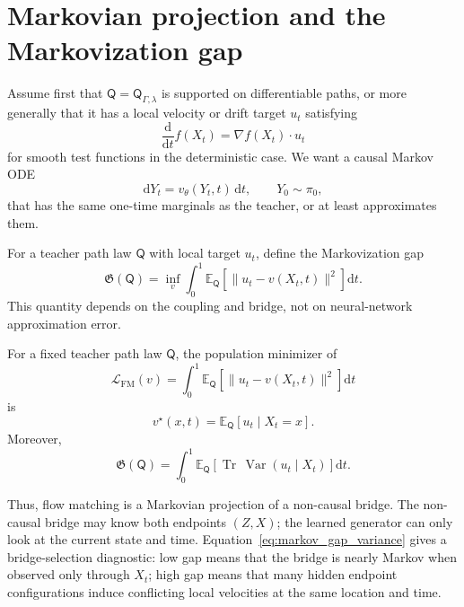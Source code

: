 \documentclass[twoside,11pt]{jmlr}
\numberwithin{equation}{section}
\newcommand{\E}{\mathbb{E}}
\newcommand{\dd}{\mathrm{d}}
\newcommand{\pbase}{\pi_0}
\newcommand{\scrQ}{\mathsf{Q}}
\newcommand{\Var}{\operatorname{Var}}
\newcommand{\Tr}{\operatorname{Tr}}
\begin{document}
\section{Markovian projection and the Markovization gap}
\label{sec:markovization}

Assume first that $\scrQ=\scrQ_{\Gamma,\lambda}$ is supported on differentiable paths, or more generally that it has a local velocity or drift target $u_t$ satisfying
\begin{equation}
    \frac{\dd}{\dd t} f(X_t)=\nabla f(X_t)\cdot u_t
\end{equation}
for smooth test functions in the deterministic case. We want a causal Markov ODE
\begin{equation}
    \dd Y_t=v_\theta(Y_t,t)\,\dd t,\qquad Y_0\sim\pbase,
    \label{eq:ode_decoder}
\end{equation}
that has the same one-time marginals as the teacher, or at least approximates them.

\begin{definition}
For a teacher path law $\scrQ$ with local target $u_t$, define the Markovization gap
\begin{equation}
    \mathfrak G(\scrQ)
    =\inf_v\int_0^1 \E_{\scrQ}\left[\|u_t-v(X_t,t)\|^2\right]\dd t.
    \label{eq:markov_gap_def}
\end{equation}
This quantity depends on the coupling and bridge, not on neural-network approximation error.
\end{definition}

\begin{proposition}
For a fixed teacher path law $\scrQ$, the population minimizer of
\begin{equation}
    \mathcal L_{\mathrm{FM}}(v)
    =\int_0^1 \E_{\scrQ}\left[\|u_t-v(X_t,t)\|^2\right] \dd t
    \label{eq:fm_loss}
\end{equation}
is
\begin{equation}
    v^\star(x,t)=\E_{\scrQ}\left[u_t\mid X_t=x\right].
    \label{eq:markov_projection_velocity}
\end{equation}
Moreover,
\begin{equation}
    \mathfrak G(\scrQ)
    =\int_0^1\E_{\scrQ}\left[\Tr\,\Var(u_t\mid X_t)\right]\dd t.
    \label{eq:markov_gap_variance}
\end{equation}
\end{proposition}

Thus, flow matching is a Markovian projection of a non-causal bridge. The non-causal bridge may know both endpoints $(Z,X)$; the learned generator can only look at the current state and time. Equation~\eqref{eq:markov_gap_variance} gives a bridge-selection diagnostic: low gap means that the bridge is nearly Markov when observed only through $X_t$; high gap means that many hidden endpoint configurations induce conflicting local velocities at the same location and time.
\end{document}
